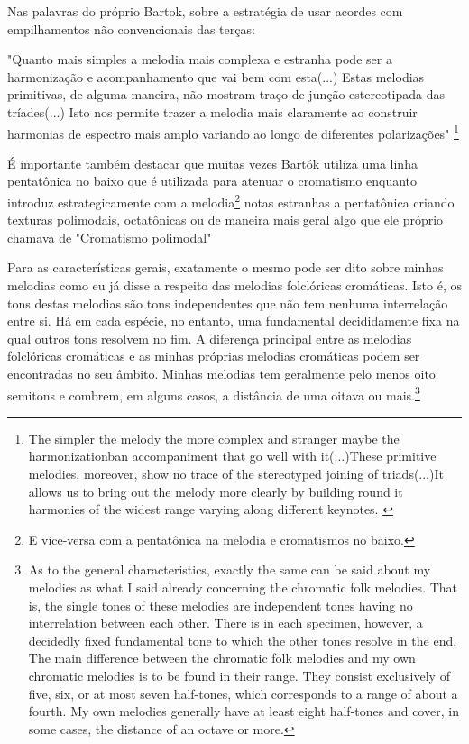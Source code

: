 \documentclass[
	12pt,				%
	openright,			%
	twoside,			%
	a4paper,			%
	english,			%
	french,				%
	spanish,			%
	brazil				%
	]{abntex2}
\begin{document}
Nas palavras do próprio Bartok, sobre a estratégia de usar acordes com empilhamentos não convencionais das terças:

\begin{citacao}
"Quanto mais simples a melodia mais complexa e estranha pode ser a harmonização e acompanhamento que vai bem com esta(...) Estas melodias primitivas, de alguma maneira, não mostram traço de junção estereotipada das tríades(...) Isto nos permite trazer a melodia mais claramente ao construir harmonias de espectro mais amplo variando ao longo de diferentes polarizações"
\cite[p. 342]{bartok1993bela}\footnote{The simpler the melody the more complex and stranger maybe the harmonizationban accompaniment that go well with it(...)These primitive melodies, moreover, show no trace of the stereotyped joining of triads(...)It allows us to bring out the melody more clearly by building round it harmonies of the widest range varying along different keynotes. \cite[p. 342]{bartok1993bela}}
\end{citacao}


É importante também destacar que muitas vezes Bartók utiliza uma linha pentatônica no baixo que é utilizada para atenuar o cromatismo enquanto introduz estrategicamente com a melodia\footnote{E vice-versa com a pentatônica na melodia e cromatismos no baixo.} notas estranhas a pentatônica criando texturas polimodais, octatônicas ou de maneira mais geral algo que ele próprio chamava de "Cromatismo polimodal"\cite{antokoletz1984music}


\begin{citacao}
Para as características gerais, exatamente o mesmo pode ser dito sobre minhas melodias como eu já disse a respeito das melodias folclóricas cromáticas. Isto é, os tons destas melodias são tons independentes que não tem nenhuma interrelação entre si. Há em cada espécie, no entanto, uma fundamental decididamente fixa na qual outros tons resolvem no fim. A diferença principal entre as melodias folclóricas cromáticas e as minhas próprias melodias cromáticas podem ser encontradas no seu âmbito. Minhas melodias tem geralmente pelo menos oito semitons e combrem, em alguns casos, a distância de uma oitava ou mais.\cite[p. 381]{bartok1993bela}\footnote{
As to the general characteristics, exactly the same can be said about my melodies as what I said already concerning the chromatic folk melodies. That is, the single tones of these melodies are independent tones having no interrelation between each other. There is in each specimen, however, a decidedly fixed fundamental tone to which the other tones resolve in the end. The main difference between the chromatic folk melodies and my own chromatic melodies is to be found in their range. They consist exclusively of five, six, or at most seven half-tones, which corresponds to a range of about a fourth. My own melodies generally have at least eight half-tones and cover, in some cases, the distance of an octave or more.\cite[p. 381]{bartok1993bela}}
\end{citacao}
\end{document}
